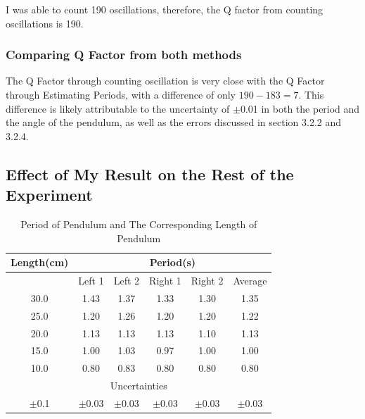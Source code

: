 \documentclass{article}
\begin{document}
\noindent I was able to count 190 oscillations, therefore, the Q factor from counting oscillations is 190.

\subsubsection{Comparing Q Factor from both methods}

The Q Factor through counting oscillation is very close with the Q Factor through Estimating Periods, with a difference of only $190-183=7$. This difference is likely attributable to the uncertainty of $\pm$0.01 in both the period and the angle of the pendulum, as well as the errors discussed in section 3.2.2 and 3.2.4.

\subsection{Effect of My Result on the Rest of the Experiment}
\begin{table}[!htb]
\caption{Period of Pendulum and The Corresponding Length of Pendulum}
\label{table_angle}
\begin{center}
\begin{tabular}{*6c}
\toprule
	Length(cm) & \multicolumn{5}{c}{Period(s)}\\
\midrule
	{} & Left 1 & Left 2 & Right 1 & Right 2 & Average\\
	30.0 & 1.43 & 1.37 & 1.33 & 1.30 & 1.35\\
	25.0 & 1.20 & 1.26 & 1.20 & 1.20 & 1.22\\
	20.0 & 1.13 & 1.13 & 1.13 & 1.10 & 1.13\\
	15.0 & 1.00 & 1.03 & 0.97 & 1.00 & 1.00\\
	10.0 & 0.80 & 0.83 & 0.80 & 0.80 & 0.80\\
\midrule
	\multicolumn{6}{c}{Uncertainties}\\
\midrule
	$\pm$0.1 & $\pm$0.03 & $\pm$0.03 & $\pm$0.03 & $\pm$0.03 & $\pm$0.03  \\
\bottomrule
\end{tabular}
\end{center}
\end{table}
\end{document}
